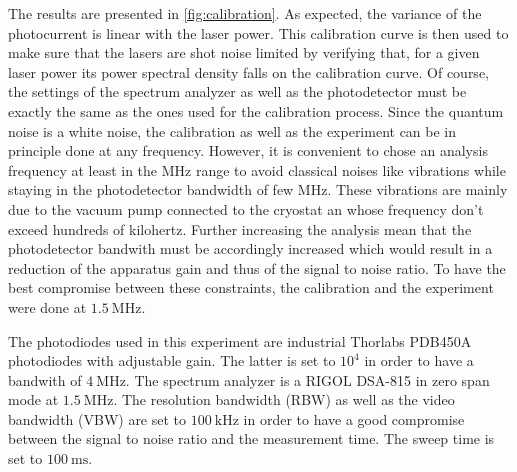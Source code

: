 The results are presented in \autoref{fig:calibration}.
As expected, the variance of the photocurrent is linear with the laser power. This calibration curve is then used to make sure that the lasers are shot noise limited by verifying that, for a given laser power 
its power spectral density falls on the calibration curve. Of course, the settings of the spectrum analyzer as well as the photodetector must be exactly the same as the ones used for the calibration process. Since the quantum noise 
is a white noise, the calibration as well as the experiment can be in principle done at any frequency. However, it is convenient to chose an analysis frequency at least in the MHz range to avoid classical noises like vibrations while staying in the photodetector bandwidth of few MHz. These vibrations are mainly due to the vacuum pump connected to the cryostat an whose 
frequency don't exceed hundreds of kilohertz. Further increasing the analysis mean that the photodetector bandwith must be accordingly increased which would result in a reduction of the apparatus gain and thus of the signal to noise ratio.
To have the best compromise between these constraints, the calibration and the experiment were done at $\SI{1.5}{\mega\hertz}$. 
 


The photodiodes used in this experiment are industrial Thorlabs PDB450A photodiodes with adjustable gain. The latter is set to $10^4$ in order to have a bandwith of $\SI{4}{\mega\hertz}$.
The spectrum analyzer is a RIGOL DSA-815 in zero span mode at $\SI{1.5}{\mega\hertz}$. The resolution bandwidth (RBW) as well as the video bandwidth (VBW) are set to $\SI{100}{\kilo\hertz}$ in order to have a good compromise between the signal to noise ratio and the measurement time.
The sweep time is set to $\SI{100}{\milli\second}$.



